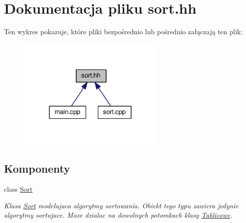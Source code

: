 \hypertarget{sort_8hh}{\section{Dokumentacja pliku sort.\-hh}
\label{sort_8hh}
}
Ten wykres pokazuje, które pliki bezpośrednio lub pośrednio załączają ten plik\-:
\nopagebreak
\begin{figure}[H]
\begin{center}
\leavevmode
\includegraphics[width=205pt]{sort_8hh__dep__incl}
\end{center}
\end{figure}
\subsection*{Komponenty}
\begin{DoxyCompactItemize}
\item 
class \hyperlink{class_sort}{Sort}
\begin{DoxyCompactList}\small\item\em Klasa \hyperlink{class_sort}{Sort} modelujaca algorytmy sortowania. Obiekt tego typu zawiera jedynie algorytmy sortujace. Moze dzialac na dowolnych potomkach klasy \hyperlink{class_tablicowe}{Tablicowe}. \end{DoxyCompactList}\end{DoxyCompactItemize}
